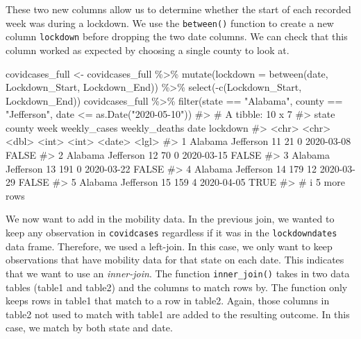 \documentclass[
  letterpaper,
]{latex/krantz}
\makeatletter
\newenvironment{Shaded}{\begin{snugshade}}{\end{snugshade}}
\newcommand{\AttributeTok}[1]{\textcolor[rgb]{0.40,0.45,0.13}{#1}}
\newcommand{\CommentTok}[1]{\textcolor[rgb]{0.37,0.37,0.37}{#1}}
\newcommand{\FunctionTok}[1]{\textcolor[rgb]{0.28,0.35,0.67}{#1}}
\newcommand{\NormalTok}[1]{\textcolor[rgb]{0.00,0.23,0.31}{#1}}
\newcommand{\OtherTok}[1]{\textcolor[rgb]{0.00,0.23,0.31}{#1}}
\newcommand{\SpecialCharTok}[1]{\textcolor[rgb]{0.37,0.37,0.37}{#1}}
\newcommand{\StringTok}[1]{\textcolor[rgb]{0.13,0.47,0.30}{#1}}
\newenvironment{kframe}{%
\medskip{}
\setlength{\fboxsep}{.8em}
 \def\at@end@of@kframe{}%
 \ifinner\ifhmode%
  \def\at@end@of@kframe{\end{minipage}}%
  \begin{minipage}{\columnwidth}%
 \fi\fi%
 \def\FrameCommand##1{\hskip\@totalleftmargin \hskip-\fboxsep
 \colorbox{shadecolor}{##1}\hskip-\fboxsep
     \hskip-\linewidth \hskip-\@totalleftmargin \hskip\columnwidth}%
 \MakeFramed {\advance\hsize-\width
   \@totalleftmargin\z@ \linewidth\hsize
   \@setminipage}}%
 {\par\unskip\endMakeFramed%
 \at@end@of@kframe}
\renewenvironment{Shaded}{\begin{kframe}}{\end{kframe}}
\makeatother
\begin{document}
These two new columns allow us to determine whether the start of each
recorded week was during a lockdown. We use the
\texttt{between()}
function to create a new column \texttt{lockdown} before dropping the
two date columns. We can check that this column worked as expected by
choosing a single county to look at.

\begin{Shaded}
\begin{Highlighting}[]
\NormalTok{covidcases\_full }\OtherTok{\textless{}{-}}\NormalTok{ covidcases\_full }\SpecialCharTok{\%\textgreater{}\%}
  \FunctionTok{mutate}\NormalTok{(}\AttributeTok{lockdown =} \FunctionTok{between}\NormalTok{(date, Lockdown\_Start, Lockdown\_End)) }\SpecialCharTok{\%\textgreater{}\%}
  \FunctionTok{select}\NormalTok{(}\SpecialCharTok{{-}}\FunctionTok{c}\NormalTok{(Lockdown\_Start, Lockdown\_End)) }
\NormalTok{covidcases\_full }\SpecialCharTok{\%\textgreater{}\%}
  \FunctionTok{filter}\NormalTok{(state }\SpecialCharTok{==} \StringTok{"Alabama"}\NormalTok{, county }\SpecialCharTok{==} \StringTok{"Jefferson"}\NormalTok{, }
\NormalTok{         date }\SpecialCharTok{\textless{}=} \FunctionTok{as.Date}\NormalTok{(}\StringTok{"2020{-}05{-}10"}\NormalTok{))}
\CommentTok{\#\textgreater{} \# A tibble: 10 x 7}
\CommentTok{\#\textgreater{}   state   county     week weekly\_cases weekly\_deaths date       lockdown}
\CommentTok{\#\textgreater{}   \textless{}chr\textgreater{}   \textless{}chr\textgreater{}     \textless{}dbl\textgreater{}        \textless{}int\textgreater{}         \textless{}int\textgreater{} \textless{}date\textgreater{}     \textless{}lgl\textgreater{}   }
\CommentTok{\#\textgreater{} 1 Alabama Jefferson    11           21             0 2020{-}03{-}08 FALSE   }
\CommentTok{\#\textgreater{} 2 Alabama Jefferson    12           70             0 2020{-}03{-}15 FALSE   }
\CommentTok{\#\textgreater{} 3 Alabama Jefferson    13          191             0 2020{-}03{-}22 FALSE   }
\CommentTok{\#\textgreater{} 4 Alabama Jefferson    14          179            12 2020{-}03{-}29 FALSE   }
\CommentTok{\#\textgreater{} 5 Alabama Jefferson    15          159             4 2020{-}04{-}05 TRUE    }
\CommentTok{\#\textgreater{} \# i 5 more rows}
\end{Highlighting}
\end{Shaded}

We now want to add in the mobility data. In the previous join, we wanted
to keep any observation in \texttt{covidcases} regardless if it was in
the \texttt{lockdowndates} data frame. Therefore, we used a left-join.
In this case, we only want to keep observations that have mobility data
for that state on each date. This indicates that we want to use an
\emph{inner-join}. The function
\texttt{inner\_join()}
takes in two data tables (table1 and table2) and the columns to match
rows by. The function only keeps rows in table1 that match to a row in
table2. Again, those columns in table2 not used to match with table1 are
added to the resulting outcome. In this case, we match by both state and
date.
\end{document}

